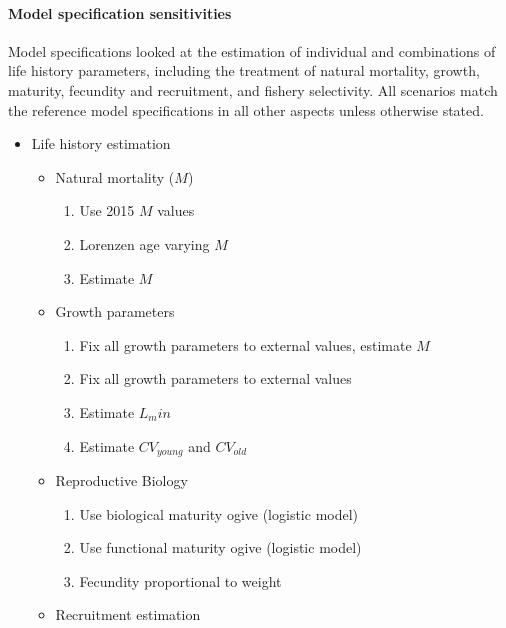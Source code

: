 \documentclass[11pt,
  english,
  letterpaper,
]{article}
\providecommand{\tightlist}{%
  \setlength{\itemsep}{0pt}\setlength{\parskip}{0pt}}
\providecommand{\tightlist}{%
  \setlength{\itemsep}{0pt}\setlength{\parskip}{0pt}}
\begin{document}
\hypertarget{model-specification-sensitivities-1}{%
\paragraph{Model specification sensitivities}\label{model-specification-sensitivities-1}}

Model specifications looked at the estimation of individual and combinations of life history parameters, including the treatment of natural mortality, growth, maturity, fecundity and recruitment, and fishery selectivity. All scenarios match the reference model specifications in all other aspects unless otherwise stated.

\begin{itemize}
\item
  Life history estimation

  \begin{itemize}
  \tightlist
  \item
    Natural mortality (\(M\))

    \begin{enumerate}
    \def\labelenumi{\arabic{enumi}.}
    \tightlist
    \item
      Use 2015 \(M\) values
    \item
      Lorenzen age varying \(M\)
    \item
      Estimate \(M\)
    \end{enumerate}
  \item
    Growth parameters

    \begin{enumerate}
    \def\labelenumi{\arabic{enumi}.}
    \setcounter{enumi}{3}
    \tightlist
    \item
      Fix all growth parameters to external values, estimate \(M\)
    \item
      Fix all growth parameters to external values
    \item
      Estimate \(L_min\)
    \item
      Estimate \(CV_{young}\) and \(CV_{old}\)
    \end{enumerate}
  \item
    Reproductive Biology

    \begin{enumerate}
    \def\labelenumi{\arabic{enumi}.}
    \setcounter{enumi}{7}
    \tightlist
    \item
      Use biological maturity ogive (logistic model)
    \item
      Use functional maturity ogive (logistic model)
    \item
      Fecundity proportional to weight
    \end{enumerate}
  \item
    Recruitment estimation


\end{itemize}
\end{itemize}
\end{document}
